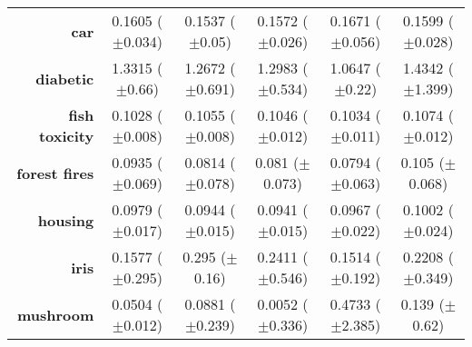 \begin{table}[htb]
{\begin{tabular}{r|ccccc}
                  \textbf{car}                 & \cellcolor[rgb]{ 1,  .878,  .51}0.1605 ($\pm$0.034)     & \cellcolor[rgb]{ .388,  .745,  .482}0.1537 ($\pm$0.05)  & \cellcolor[rgb]{ .733,  .843,  .502}0.1572 ($\pm$0.026) & \cellcolor[rgb]{ .973,  .412,  .42}0.1671 ($\pm$0.056)  & \cellcolor[rgb]{ 1,  .922,  .518}0.1599 ($\pm$0.028)    \\
                  \textbf{diabetic}            & \cellcolor[rgb]{ .996,  .8,  .494}1.3315 ($\pm$0.66)    & \cellcolor[rgb]{ .918,  .894,  .51}1.2672 ($\pm$0.691)  & \cellcolor[rgb]{ 1,  .922,  .518}1.2983 ($\pm$0.534)    & \cellcolor[rgb]{ .388,  .745,  .482}1.0647 ($\pm$0.22)  & \cellcolor[rgb]{ .973,  .412,  .42}1.4342 ($\pm$1.399)  \\
                  \textbf{fish toxicity}       & \cellcolor[rgb]{ .388,  .745,  .482}0.1028 ($\pm$0.008) & \cellcolor[rgb]{ .992,  .749,  .486}0.1055 ($\pm$0.008) & \cellcolor[rgb]{ 1,  .922,  .518}0.1046 ($\pm$0.012)    & \cellcolor[rgb]{ .604,  .808,  .494}0.1034 ($\pm$0.011) & \cellcolor[rgb]{ .973,  .412,  .42}0.1074 ($\pm$0.012)  \\
                  \textbf{forest fires}        & \cellcolor[rgb]{ .988,  .663,  .471}0.0935 ($\pm$0.069) & \cellcolor[rgb]{ 1,  .922,  .518}0.0814 ($\pm$0.078)    & \cellcolor[rgb]{ .863,  .882,  .51}0.081 ($\pm$0.073)   & \cellcolor[rgb]{ .388,  .745,  .482}0.0794 ($\pm$0.063) & \cellcolor[rgb]{ .973,  .412,  .42}0.105 ($\pm$0.068)   \\
                  \textbf{housing}             & \cellcolor[rgb]{ .992,  .745,  .486}0.0979 ($\pm$0.017) & \cellcolor[rgb]{ .467,  .769,  .486}0.0944 ($\pm$0.015) & \cellcolor[rgb]{ .388,  .745,  .482}0.0941 ($\pm$0.015) & \cellcolor[rgb]{ 1,  .922,  .518}0.0967 ($\pm$0.022)    & \cellcolor[rgb]{ .973,  .412,  .42}0.1002 ($\pm$0.024)  \\
                  \textbf{iris}                & \cellcolor[rgb]{ .443,  .761,  .482}0.1577 ($\pm$0.295) & \cellcolor[rgb]{ .973,  .412,  .42}0.295 ($\pm$0.16)    & \cellcolor[rgb]{ .996,  .784,  .494}0.2411 ($\pm$0.546) & \cellcolor[rgb]{ .388,  .745,  .482}0.1514 ($\pm$0.192) & \cellcolor[rgb]{ 1,  .922,  .518}0.2208 ($\pm$0.349)    \\
                  \textbf{mushroom}            & \cellcolor[rgb]{ .722,  .839,  .498}0.0504 ($\pm$0.012) & \cellcolor[rgb]{ 1,  .922,  .518}0.0881 ($\pm$0.239)    & \cellcolor[rgb]{ .388,  .745,  .482}0.0052 ($\pm$0.336) & \cellcolor[rgb]{ .973,  .412,  .42}0.4733 ($\pm$2.385)  & \cellcolor[rgb]{ 1,  .855,  .506}0.139 ($\pm$0.62)      \\

\end{tabular}}
\end{table}
